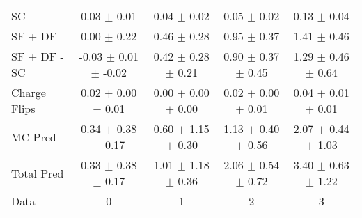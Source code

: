 \begin{tabular}{l|cccc}
                                 SC &  0.03 $\pm$  0.01 &  0.04 $\pm$  0.02 &  0.05 $\pm$  0.02 &  0.13 $\pm$  0.04 \\
                            SF + DF &  0.00 $\pm$  0.22 &  0.46 $\pm$  0.28 &  0.95 $\pm$  0.37 &  1.41 $\pm$  0.46 \\
\hline
                       SF + DF - SC & -0.03 $\pm$  0.01 $\pm$ -0.02 &  0.42 $\pm$  0.28 $\pm$  0.21 &  0.90 $\pm$  0.37 $\pm$  0.45 &  1.29 $\pm$  0.46 $\pm$  0.64 \\
\hline\hline
                       Charge Flips &  0.02 $\pm$  0.00 $\pm$  0.01 &  0.00 $\pm$  0.00 $\pm$  0.00 &  0.02 $\pm$  0.00 $\pm$  0.01 &  0.04 $\pm$  0.01 $\pm$  0.01 \\
\hline
                            MC Pred &  0.34 $\pm$  0.38 $\pm$  0.17 &  0.60 $\pm$  1.15 $\pm$  0.30 &  1.13 $\pm$  0.40 $\pm$  0.56 &  2.07 $\pm$  0.44 $\pm$  1.03 \\
\hline
                         Total Pred &  0.33 $\pm$  0.38 $\pm$  0.17 &  1.01 $\pm$  1.18 $\pm$  0.36 &  2.06 $\pm$  0.54 $\pm$  0.72 &  3.40 $\pm$  0.63 $\pm$  1.22 \\
\hline\hline
                               Data &     0 &     1 &     2 &     3 \\
\hline\hline
\end{tabular}

